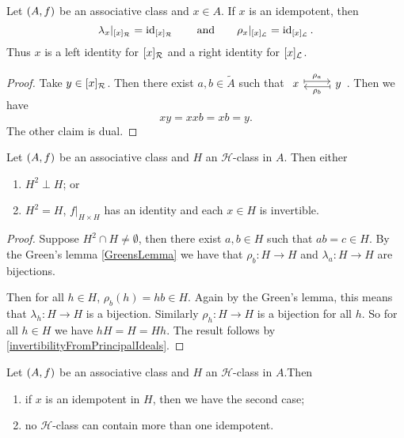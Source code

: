\begin{corollary}
Let $\left( A, f \right)$ be an associative class and $x\in A$. If $x$ is an idempotent, then
\[ \lambda_x|_{[x]_{\mathcal{R}}} = \operatorname{id}_{[x]_{\mathcal{R}}} \qquad \text{and} \qquad \rho_x|_{[x]_{\mathcal{L}}} = \operatorname{id}_{[x]_{\mathcal{L}}}. \]
Thus $x$ is a left identity for $[x]_{\mathcal{R}}$ and a right identity for $[x]_{\mathcal{L}}$.
\end{corollary}
\begin{proof}
Take $y\in [x]_{\mathcal{R}}$. Then there exist $a,b\in \widetilde{A}$ such that $\begin{tikzcd}
x \ar[r, maps to, shift left, "\rho_a"] & y \ar[l, maps to, shift left, "\rho_b"]
\end{tikzcd}$. Then we have
\[ xy = xxb = xb = y. \]
The other claim is dual.
\end{proof}

\begin{theorem}
Let $\left( A, f \right)$ be an associative class and $H$ an $\mathcal{H}$-class in $A$. Then either
\begin{enumerate}
\item $H^2\perp H$; or
\item $H^2 = H$, $f|_{H\times H}$ has an identity and each $x\in H$ is invertible.
\end{enumerate}
\end{theorem}
\begin{proof}
Suppose $H^2\cap H \neq \emptyset$, then there exist $a,b\in H$ such that $ab = c\in H$. By the Green's lemma \ref{GreensLemma} we have that $\rho_b:H\to H$ and $\lambda_a: H\to H$ are bijections.

Then for all $h\in H$, $\rho_b(h) = hb \in H$. Again by the Green's lemma, this means that $\lambda_h: H\to H$ is a bijection. Similarly $\rho_h: H\to H$ is a bijection for all $h$. So for all $h\in H$ we have $hH = H = Hh$. The result follows by \ref{invertibilityFromPrincipalIdeals}.
\end{proof}
\begin{corollary} \label{GreensTheoremCorollary}
Let $\left( A, f \right)$ be an associative class and $H$ an $\mathcal{H}$-class in $A$.Then
\begin{enumerate}
\item if $x$ is an idempotent in $H$, then we have the second case;
\item no $\mathcal{H}$-class can contain more than one idempotent. 
\end{enumerate}
\end{corollary}

